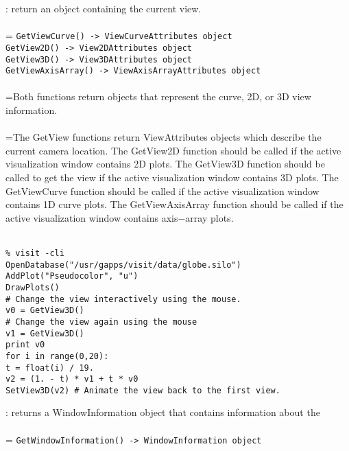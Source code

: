 \documentclass[10pt,a4paper]{report}
\begin{document}
{}
: return an object containing the current view.\\[-3mm]

 \\ 
\hangindent=\parindent 
\verb!GetViewCurve() -> ViewCurveAttributes object!\\ 
\verb!GetView2D() -> View2DAttributes object!\\ 
\verb!GetView3D() -> View3DAttributes object!\\ 
\verb!GetViewAxisArray() -> ViewAxisArrayAttributes object!\\ [-3mm]

 \\ 
\hangindent=\parindent Both functions return objects that represent the curve, 2D, or 3D view information. \\[-3mm] 

 \\ 
\hangindent=\parindent The GetView functions return ViewAttributes objects which describe the current camera location. The GetView2D function should be called if the active visualization window contains 2D plots. The GetView3D function should be called to get the view if the active visualization window contains 3D plots. The GetViewCurve function should be called if the active visualization window contains 1D curve plots.  The GetViewAxisArray function should be called if the active visualization window contains axis$-$array plots. \\[-3mm] 

\\[-6mm]
\begin{verbatim}% visit -cli
OpenDatabase("/usr/gapps/visit/data/globe.silo")
AddPlot("Pseudocolor", "u")
DrawPlots()
# Change the view interactively using the mouse.
v0 = GetView3D()
# Change the view again using the mouse
v1 = GetView3D()
print v0
for i in range(0,20):
t = float(i) / 19.
v2 = (1. - t) * v1 + t * v0
SetView3D(v2) # Animate the view back to the first view.
\end{verbatim}
\newpage


{}
: returns a WindowInformation object that contains information about the\\[-3mm]

 \\ 
\hangindent=\parindent 
\verb!GetWindowInformation() -> WindowInformation object!\\ [-3mm]
\end{document}
